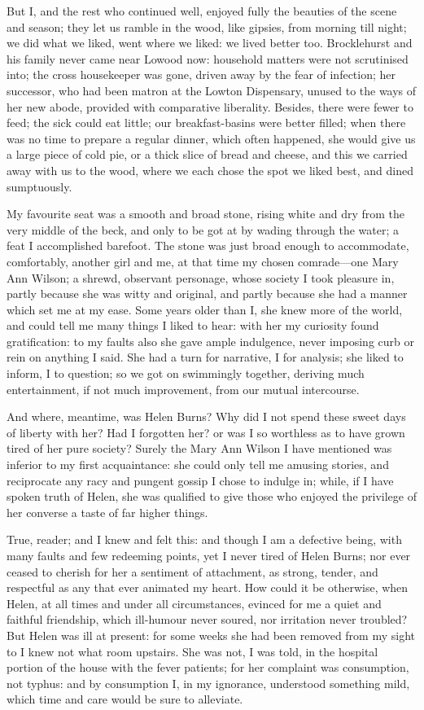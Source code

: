 But I, and the rest who continued well, enjoyed fully the beauties of
the scene and season; they let us ramble in the wood, like gipsies, from
morning till night; we did what we liked, went where we liked: we lived
better too. \Mr{} Brocklehurst and his family never came near Lowood now:
household matters were not scrutinised into; the cross housekeeper was
gone, driven away by the fear of infection; her successor, who had been
matron at the Lowton Dispensary, unused to the ways of her new abode,
provided with comparative liberality. Besides, there were fewer to
feed; the sick could eat little; our breakfast-basins were better
filled; when there was no time to prepare a regular dinner, which often
happened, she would give us a large piece of cold pie, or a thick slice
of bread and cheese, and this we carried away with us to the wood, where
we each chose the spot we liked best, and dined sumptuously.

My favourite seat was a smooth and broad stone, rising white and dry
from the very middle of the beck, and only to be got at by wading
through the water; a feat I accomplished barefoot. The stone was just
broad enough to accommodate, comfortably, another girl and me, at that
time my chosen comrade---one Mary Ann Wilson; a shrewd, observant
personage, whose society I took pleasure in, partly because she was
witty and original, and partly because she had a manner which set me at
my ease. Some years older than I, she knew more of the world, and could
tell me many things I liked to hear: with her my curiosity found
gratification: to my faults also she gave ample indulgence, never
imposing curb or rein on anything I said. She had a turn for narrative,
I for analysis; she liked to inform, I to question; so we got on
swimmingly together, deriving much entertainment, if not much
improvement, from our mutual intercourse.

And where, meantime, was Helen Burns? Why did I not spend these sweet
days of liberty with her? Had I forgotten her? or was I so worthless as
to have grown tired of her pure society? Surely the Mary Ann Wilson I
have mentioned was inferior to my first acquaintance: she could only
tell me amusing stories, and reciprocate any racy and pungent gossip I
chose to indulge in; while, if I have spoken truth of Helen, she was
qualified to give those who enjoyed the privilege of her converse a
taste of far higher things.

True, reader; and I knew and felt this: and though I am a defective
being, with many faults and few redeeming points, yet I never tired of
Helen Burns; nor ever ceased to cherish for her a sentiment of
attachment, as strong, tender, and respectful as any that ever animated
my heart. How could it be otherwise, when Helen, at all times and under
all circumstances, evinced for me a quiet and faithful friendship, which
ill-humour never soured, nor irritation never troubled? But Helen was
ill at present: for some weeks she had been removed from my sight to I
knew not what room upstairs. She was not, I was told, in the hospital
portion of the house with the fever patients; for her complaint was
consumption, not typhus: and by consumption I, in my ignorance,
understood something mild, which time and care would be sure to
alleviate.


